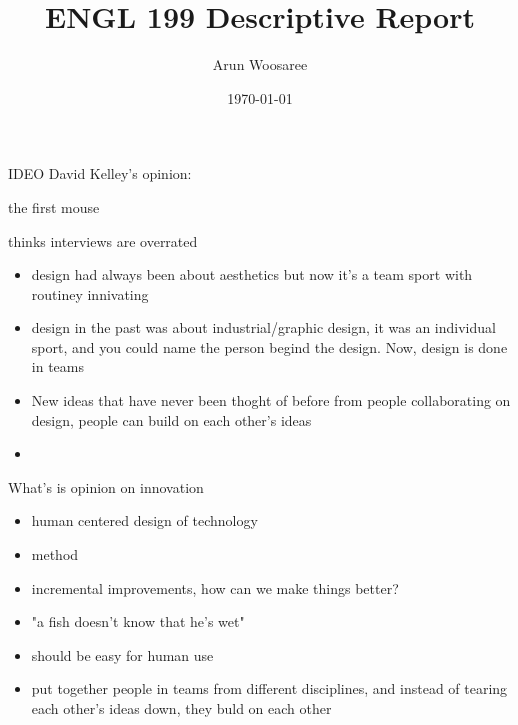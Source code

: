 \documentclass{article}
\title{ENGL 199 Descriptive Report}
\date{\today}
\author{Arun Woosaree}
\begin{document}
  IDEO David Kelley's opinion:

  the first mouse

  thinks interviews are overrated


  \begin{itemize}
    \item design had always been about aesthetics but now it's a team sport with routiney innivating
    \item design in the past was about industrial/graphic design, it was an individual sport, and you could
    name the person begind the design. Now, design is done in teams
    \item New ideas that have never been thoght of before from people collaborating on design, people
    can build on each other's ideas
    \item
  \end{itemize}

  What's is opinion on innovation
  \begin{itemize}
    \item human centered design of technology
    \item method
    \item incremental improvements, how can we make things better?
    \item "a fish doesn't know that he's wet"
    \item should be easy for human use
    \item put together people in teams from different disciplines, and instead of tearing
    each other's ideas down, they buld on each other

  \end{itemize}





  \newpage
\end{document}
